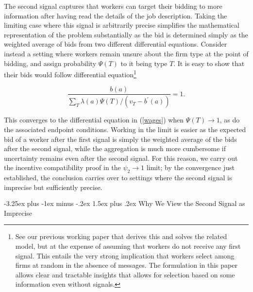 \documentclass[12pt]{article}
\makeatletter
\renewcommand{\subsection}{%
  \@startsection{subsection}{2}{\z@}%
  {-3.25ex plus -1ex minus -.2ex}%
  {1.5ex plus .2ex}%
  {\normalfont\large\bfseries}%
}
\makeatother
\begin{document}
The second signal captures that workers can target their bidding to more information after having read the
details of the job description. Taking the limiting case where this signal
is arbitrarily precise simplifies the mathematical representation of the
problem substantially as the bid is determined simply as the weighted
average of bids from two different differential equations. Consider instead
a setting where workers remain unsure about the firm type at the point of
bidding, and assign probability $\Psi (T)$ to it being type $T$. It is easy
to show that their bids would follow differential equation\footnote{
See our previous working paper \citep{horton2021sorting} that
derives this and solves the related model, but at the expense of assuming
that workers do not receive any first signal. This entails the very strong
implication that workers select among firms at random in the absence of
messages. The formulation in this paper allows clear and tractable insights
that allows for selection based on some information even without signals.}

\[
\frac{b(a)}{\sum\nolimits_{T}\lambda (a)\Psi (T)/(v_{T}-b^{\prime }(a))} =1.
\]

This converges to the differential equation in (\ref{wages}) when $\Psi(T)\longrightarrow 1$, as do the associated endpoint conditions. Working in the limit is easier as the expected bid of a worker after the first signal is simply the weighted average of the bids after the second signal, while the aggregation is much more cumbersome if uncertainty remains even after the second signal. For this reason, we carry out the incentive compatibility proof in the $\psi_{2}\to 1$ limit; by the convergence just established, the conclusion carries over to settings where the second signal is imprecise but sufficiently precise.

\subsection{Why We View the Second Signal as Imprecise}\label{online_app:imprecise_second_signal}
\end{document}
